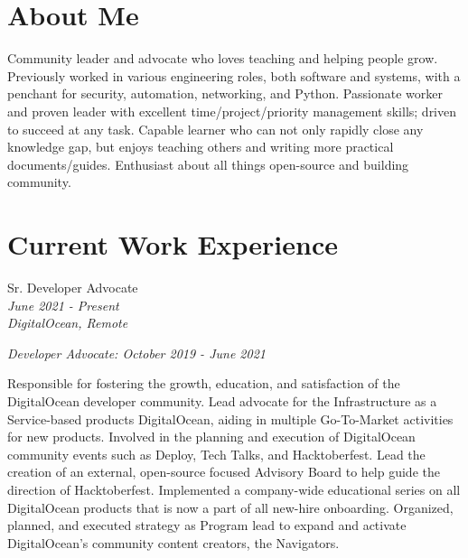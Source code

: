 \documentclass[10pt]{article} %
\begin{document}
\begin{minipage}[t]{0.5\textwidth} %
\vspace{0pt} %
    
\section{About Me}
Community leader and advocate who loves teaching and helping people grow. Previously worked in various engineering roles, both software and systems, with a penchant for security, automation, networking, and Python. Passionate worker and proven leader with excellent time/project/priority management skills; driven to succeed at any task. Capable learner who can not only rapidly close any knowledge gap, but enjoys teaching others and writing more practical documents/guides. Enthusiast about all things open-source and building community.


\section{Current Work Experience} 


{\raggedright\large Sr. Developer Advocate\\
\small \textit{June 2021 - Present}\\
\small \textit{DigitalOcean, Remote} \\
\raggedright\small \textit{Developer Advocate: October 2019 - June 2021}\\[5pt]}

\normalsize{
    Responsible for fostering the growth, education, and satisfaction of the DigitalOcean developer community. Lead advocate for the Infrastructure as a Service-based products DigitalOcean, aiding in multiple Go-To-Market activities for new products. Involved in the planning and execution of DigitalOcean community events such as Deploy, Tech Talks, and Hacktoberfest. Lead the creation of an external, open-source focused Advisory Board to help guide the direction of Hacktoberfest. Implemented a company-wide educational series on all DigitalOcean products that is now a part of all new-hire onboarding. Organized, planned, and executed strategy as Program lead to expand and activate DigitalOcean's community content creators, the Navigators. \\
    
}
\end{minipage}
\end{document}
